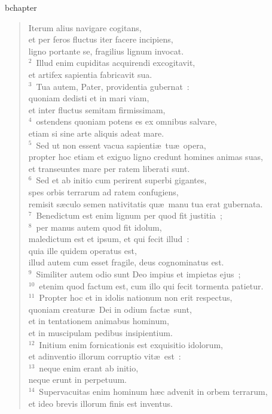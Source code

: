 bchapter\begin{flushleft}\begin{verse}\vspace{-19pt}\hspace{6pt}Iterum alius navigare cogitans,\\\hspace{6pt} et per feros fluctus iter facere incipiens,\\ ligno portante se, fragilius lignum invocat.\\
${}^{2}$~Illud enim cupiditas acquirendi excogitavit,\\ et artifex sapientia fabricavit sua.\\
${}^{3}$~Tua autem, Pater, providentia gubernat~:\\ quoniam dedisti et in mari viam,\\ et inter fluctus semitam firmissimam,\\
${}^{4}$~ostendens quoniam potens es ex omnibus salvare,\\ etiam si sine arte aliquis adeat mare.\\
${}^{5}$~Sed ut non essent vacua sapienti\ae\ tu\ae\ opera,\\ propter hoc etiam et exiguo ligno credunt homines animas suas,\\ et transeuntes mare per ratem liberati sunt.\\
${}^{6}$~Sed et ab initio cum perirent superbi gigantes,\\ spes orbis terrarum ad ratem confugiens,\\ remisit s\ae culo semen nativitatis qu\ae\ manu tua erat gubernata.\\
${}^{7}$~Benedictum est enim lignum per quod fit justitia~;\\
${}^{8}$~per manus autem quod fit idolum,\\ maledictum est et ipsum, et qui fecit illud~:\\ quia ille quidem operatus est,\\ illud autem cum esset fragile, deus cognominatus est.\\
${}^{9}$~Similiter autem odio sunt Deo impius et impietas ejus~;\\
${}^{10}$~etenim quod factum est, cum illo qui fecit tormenta patietur.\\
${}^{11}$~Propter hoc et in idolis nationum non erit respectus,\\ quoniam creatur\ae\ Dei in odium fact\ae\ sunt,\\ et in tentationem animabus hominum,\\ et in muscipulam pedibus insipientium.\\
${}^{12}$~Initium enim fornicationis est exquisitio idolorum,\\ et adinventio illorum corruptio vit\ae\ est~:\\
${}^{13}$~neque enim erant ab initio,\\ neque erunt in perpetuum.\\
${}^{14}$~Supervacuitas enim hominum h\ae c advenit in orbem terrarum,\\ et ideo brevis illorum finis est inventus.\end{verse}\end{flushleft}


